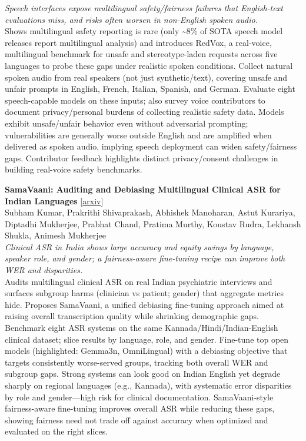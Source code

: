 \documentclass[12pt,letterpaper]{article}
\begin{document}
{\small\textit{Speech interfaces expose multilingual safety/fairness failures that English-text evaluations miss, and risks often worsen in non-English spoken audio.}}\\[1pt]
{\footnotesize Shows multilingual safety reporting is rare (only \textasciitilde{}8\% of SOTA speech model releases report multilingual analysis) and introduces RedVox, a real-voice, multilingual benchmark for unsafe and stereotype-laden requests across five languages to probe these gaps under realistic spoken conditions. Collect natural spoken audio from real speakers (not just synthetic/text), covering unsafe and unfair prompts in English, French, Italian, Spanish, and German. Evaluate eight speech-capable models on these inputs; also survey voice contributors to document privacy/personal burdens of collecting realistic safety data. Models exhibit unsafe/unfair behavior even without adversarial prompting; vulnerabilities are generally worse outside English and are amplified when delivered as spoken audio, implying speech deployment can widen safety/fairness gaps. Contributor feedback highlights distinct privacy/consent challenges in building real-voice safety benchmarks.}

\medskip

{\small\textbf{SamaVaani: Auditing and Debiasing Multilingual Clinical ASR for Indian Languages}} {\scriptsize[\href{https://arxiv.org/abs/2606.26901}{arxiv}]}\\
{\scriptsize Subham Kumar, Prakrithi Shivaprakash, Abhishek Manoharan, Astut Kurariya, Diptadhi Mukherjee, Prabhat Chand, Pratima Murthy, Koustav Rudra, Lekhansh Shukla, Animesh Mukherjee}\\

{\small\textit{Clinical ASR in India shows large accuracy and equity swings by language, speaker role, and gender; a fairness-aware fine-tuning recipe can improve both WER and disparities.}}\\[1pt]
{\footnotesize Audits multilingual clinical ASR on real Indian psychiatric interviews and surfaces subgroup harms (clinician vs patient; gender) that aggregate metrics hide. Proposes SamaVaani, a unified debiasing fine-tuning approach aimed at raising overall transcription quality while shrinking demographic gaps. Benchmark eight ASR systems on the same Kannada/Hindi/Indian-English clinical dataset; slice results by language, role, and gender. Fine-tune top open models (highlighted: Gemma3n, OmniLingual) with a debiasing objective that targets consistently worse-served groups, tracking both overall WER and subgroup gaps. Strong systems can look good on Indian English yet degrade sharply on regional languages (e.g., Kannada), with systematic error disparities by role and gender---high risk for clinical documentation. SamaVaani-style fairness-aware fine-tuning improves overall ASR while reducing these gaps, showing fairness need not trade off against accuracy when optimized and evaluated on the right slices.}
\end{document}
